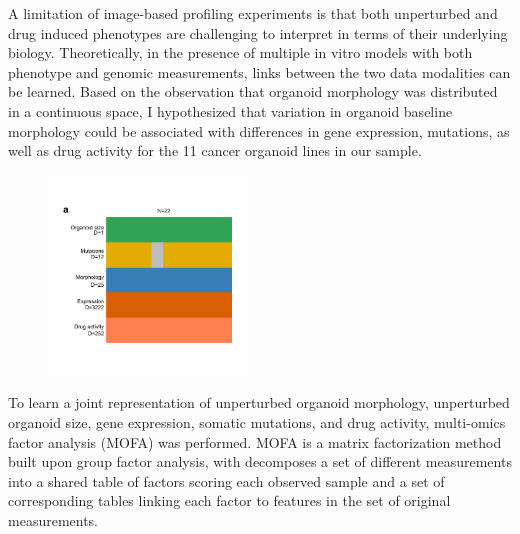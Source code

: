 \begin{flushleft}
A limitation of image-based profiling experiments is that both unperturbed and drug induced phenotypes are challenging to interpret in terms of their underlying biology. Theoretically, in the presence of multiple in vitro models with both phenotype and genomic measurements, links between the two data modalities can be learned. Based on the observation that organoid morphology was distributed in a continuous space, I hypothesized that variation in organoid baseline morphology could be associated with differences in gene expression, mutations, as well as drug activity for the 11 cancer organoid lines in our sample. 

\begin{figure}[h!]
\centering
\includegraphics[width=200,
                height=\textheight,
                keepaspectratio]{figures/promise/pdf/fig_4_2.pdf}
\caption{}
\label{fig_242}
\end{figure}

\bigbreak
To learn a joint representation of unperturbed organoid morphology, unperturbed organoid size, gene expression, somatic mutations, and drug activity, multi-omics factor analysis (MOFA) was performed. MOFA is a matrix factorization method built upon group factor analysis, with decomposes a set of different measurements into a shared table of factors scoring each observed sample and a set of corresponding tables linking each factor to features in the set of original measurements. 


\end{flushleft}
